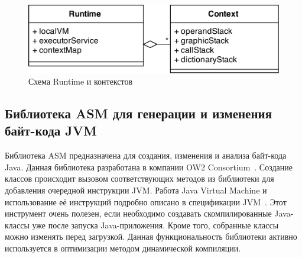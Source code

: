 	\begin{figure} [h]
			\includegraphics[width=\linewidth]{Pozdin/UML_Runtime_Context.png}
			\caption{Схема Runtime и контекстов}\label{UML_runtime_contexts}
	\end{figure}
		
	\subsection{Библиотека ASM для генерации и изменения байт-кода JVM}
	Библиотека ASM предназначена для создания, изменения и анализа байт-кода Java. Данная библиотека разработана в компании OW2 Consortium~\cite{ow2-site}. Создание классов происходит вызовом соответствующих методов из библиотеки для добавления очередной инструкции JVM. Работа Java Virtual Machine и использование её инструкций подробно описано в спецификации JVM~\cite{jvms}. Этот инструмент очень полезен, если необходимо создавать скомпилированные Java-классы уже после запуска Java-приложения.  Кроме того, собранные классы можно изменять перед загрузкой. Данная функциональность библиотеки активно используется в оптимизации методом динамической компиляции. 


	
